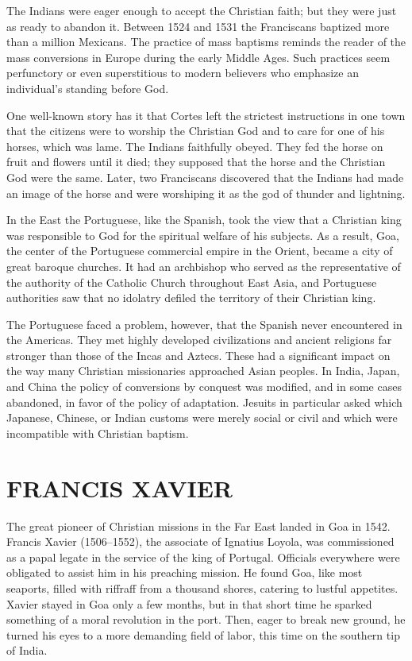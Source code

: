 The Indians were eager enough to accept the Christian faith; but they were just as ready to abandon
it. Between 1524 and 1531 the Franciscans baptized more than a million Mexicans. The practice of
mass baptisms reminds the reader of the mass conversions in Europe during the early Middle Ages.
Such practices seem perfunctory or even superstitious to modern believers who emphasize an
individual’s standing before God.

One well-known story has it that Cortes left the strictest instructions in one town that the
citizens were to worship the Christian God and to care for one of his horses, which was lame. The
Indians faithfully obeyed. They fed the horse on fruit and flowers until it died; they supposed that
the horse and the Christian God were the same. Later, two Franciscans discovered that the Indians
had made an image of the horse and were worshiping it as the god of thunder and lightning.

In the East the Portuguese, like the Spanish, took the view that a Christian king was responsible to
God for the spiritual welfare of his subjects. As a result, Goa, the center of the Portuguese
commercial empire in the Orient, became a city of great baroque churches. It had an archbishop who
served as the representative of the authority of the Catholic Church throughout East Asia, and
Portuguese authorities saw that no idolatry defiled the territory of their Christian king.

The Portuguese faced a problem, however, that the Spanish never encountered in the Americas. They
met highly developed civilizations and ancient religions far stronger than those of the Incas and
Aztecs. These had a significant impact on the way many Christian missionaries approached Asian
peoples. In India, Japan, and China the policy of conversions by conquest was modified, and in some
cases abandoned, in favor of the policy of adaptation. Jesuits in particular asked which Japanese,
Chinese, or Indian customs were merely social or civil and which were incompatible with Christian
baptism.

\section{FRANCIS XAVIER}

The great pioneer of Christian missions in the Far East landed in Goa in 1542. Francis Xavier
(1506–1552), the associate of Ignatius Loyola, was commissioned as a papal legate in the service of
the king of Portugal. Officials everywhere were obligated to assist him in his preaching mission. He
found Goa, like most seaports, filled with riffraff from a thousand shores, catering to lustful
appetites. Xavier stayed in Goa only a few months, but in that short time he sparked something of a
moral revolution in the port. Then, eager to break new ground, he turned his eyes to a more
demanding field of labor, this time on the southern tip of India.

